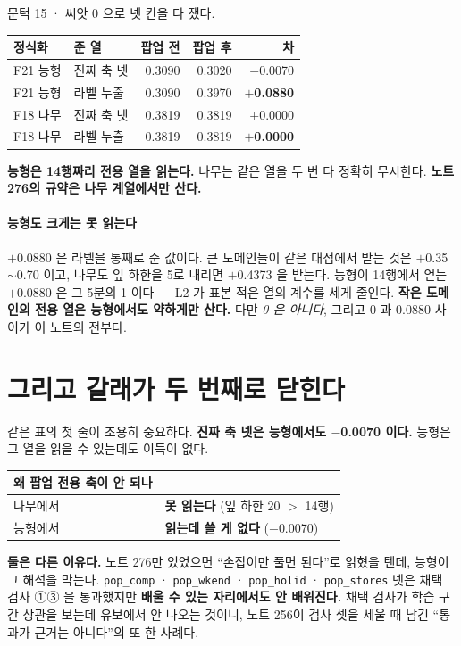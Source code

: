 \documentclass[10pt]{article}
\begin{document}
문턱 15 · 씨앗 0 으로 넷 칸을 다 쟀다.

\begin{center}\small
\begin{tabular}{llrrr}
\hline
정식화 & 준 열 & 팝업 전 & 팝업 후 & 차 \\
\hline
F21 능형 & 진짜 축 넷 & 0.3090 & 0.3020 & $-$0.0070 \\
F21 능형 & 라벨 누출 & 0.3090 & 0.3970 & \textbf{$+$0.0880} \\
F18 나무 & 진짜 축 넷 & 0.3819 & 0.3819 & $+$0.0000 \\
F18 나무 & 라벨 누출 & 0.3819 & 0.3819 & \textbf{$+$0.0000} \\
\hline
\end{tabular}
\end{center}

\textbf{능형은 14행짜리 전용 열을 읽는다.} 나무는 같은 열을 두 번 다
정확히 무시한다. \textbf{노트 276의 규약은 나무 계열에서만 산다.}

\paragraph{능형도 크게는 못 읽는다} $+$0.0880 은 라벨을 통째로 준 값이다.
큰 도메인들이 같은 대접에서 받는 것은 $+$0.35$\sim$0.70 이고, 나무도 잎
하한을 5로 내리면 $+$0.4373 을 받는다. 능형이 14행에서 얻는 $+$0.0880 은
그 5분의 1 이다 --- L2 가 표본 적은 열의 계수를 세게 줄인다. \textbf{작은
도메인의 전용 열은 능형에서도 약하게만 산다.} 다만 \emph{0 은 아니다},
그리고 0 과 0.0880 사이가 이 노트의 전부다.

\section{그리고 갈래가 두 번째로 닫힌다}

같은 표의 첫 줄이 조용히 중요하다. \textbf{진짜 축 넷은 능형에서도
$-$0.0070 이다.} 능형은 그 열을 읽을 수 있는데도 이득이 없다.

\begin{center}\small
\begin{tabular}{ll}
\hline
왜 팝업 전용 축이 안 되나 & \\
\hline
나무에서 & \textbf{못 읽는다} (잎 하한 20 $>$ 14행) \\
능형에서 & \textbf{읽는데 쓸 게 없다} ($-$0.0070) \\
\hline
\end{tabular}
\end{center}

\textbf{둘은 다른 이유다.} 노트 276만 있었으면 ``손잡이만 풀면 된다''로
읽혔을 텐데, 능형이 그 해석을 막는다. \texttt{pop\_comp} ·
\texttt{pop\_wkend} · \texttt{pop\_holid} · \texttt{pop\_stores} 넷은 채택
검사 ①③ 을 통과했지만 \textbf{배울 수 있는 자리에서도 안 배워진다.}
채택 검사가 학습 구간 상관을 보는데 유보에서 안 나오는 것이니, 노트 256이
검사 셋을 세울 때 남긴 ``통과가 근거는 아니다''의 또 한 사례다.
\end{document}
